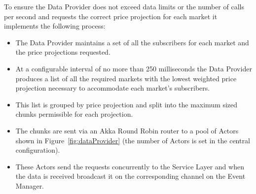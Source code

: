 		\begin{table}[h]
			\centering
			\noindent{}
			\caption{Price projection hierarchy}
			\label{tab:priceProjectionHierarchy}
		\end{table}
		
		To ensure the Data Provider does not exceed data limits or the number of calls per second and requests the correct price projection for each market it implements the following process:
		\begin{itemize}
			\item The Data Provider maintains a set of all the subscribers for each market and the price projections requested.
			\item At a configurable interval of no more than 250 milliseconds the Data Provider produces a list of all the required markets with the lowest weighted price projection necessary to accommodate each market's subscribers.
			\item This list is grouped by price projection and split into the maximum sized chunks permissible for each projection.
			\item The chunks are sent via an Akka Round Robin router\cite{AkkaRoundRobinRouter} to a pool of Actors shown in Figure~\ref{fig:dataProvider} (the number of Actors is set in the central configuration).
			\item These Actors send the requests concurrently to the Service Layer and when the data is received broadcast it on the corresponding channel on the Event Manager.
		\end{itemize}

